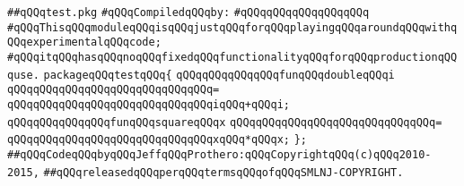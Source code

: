 \label{src/app/makelib/test/test.pkg}
\verb|##qQQqtest.pkg|\newline
\newline
\verb|#qQQqCompiledqQQqby:|\newline
\verb|#qQQqqQQqqQQqqQQqqQQq|\newline
\newline
\verb|#qQQqThisqQQqmoduleqQQqisqQQqjustqQQqforqQQqplayingqQQqaroundqQQqwithqQQqexperimentalqQQqcode;|\newline
\verb|#qQQqitqQQqhasqQQqnoqQQqfixedqQQqfunctionalityqQQqforqQQqproductionqQQquse.|\newline
\newline
\verb|packageqQQqtestqQQq{|\newline
\newline
\verb|qQQqqQQqqQQqqQQqfunqQQqdoubleqQQqi|\newline
\verb|qQQqqQQqqQQqqQQqqQQqqQQqqQQqqQQq=|\newline
\verb|qQQqqQQqqQQqqQQqqQQqqQQqqQQqqQQqiqQQq+qQQqi;|\newline
\newline
\verb|qQQqqQQqqQQqqQQqfunqQQqsquareqQQqx|\newline
\verb|qQQqqQQqqQQqqQQqqQQqqQQqqQQqqQQq=|\newline
\verb|qQQqqQQqqQQqqQQqqQQqqQQqqQQqqQQqxqQQq*qQQqx;|\newline
\verb|};|\newline
\newline
\newline
\verb|##qQQqCodeqQQqbyqQQqJeffqQQqProthero:qQQqCopyrightqQQq(c)qQQq2010-2015,|\newline
\verb|##qQQqreleasedqQQqperqQQqtermsqQQqofqQQqSMLNJ-COPYRIGHT.|\newline

